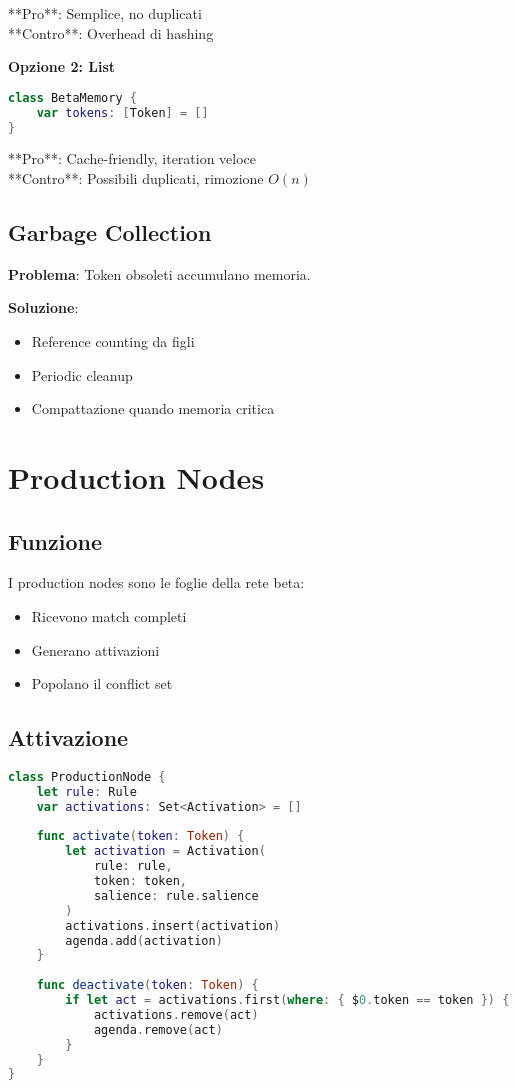 **Pro**: Semplice, no duplicati \\
**Contro**: Overhead di hashing

\textbf{Opzione 2: List}
\begin{lstlisting}[language=Swift]
class BetaMemory {
    var tokens: [Token] = []
}
\end{lstlisting}

**Pro**: Cache-friendly, iteration veloce \\
**Contro**: Possibili duplicati, rimozione $O(n)$

\subsection{Garbage Collection}

\textbf{Problema}: Token obsoleti accumulano memoria.

\textbf{Soluzione}:
\begin{itemize}
\item Reference counting da figli
\item Periodic cleanup
\item Compattazione quando memoria critica
\end{itemize}

\section{Production Nodes}

\subsection{Funzione}

I production nodes sono le foglie della rete beta:
\begin{itemize}
\item Ricevono match completi
\item Generano attivazioni
\item Popolano il conflict set
\end{itemize}

\subsection{Attivazione}

\begin{lstlisting}[language=Swift]
class ProductionNode {
    let rule: Rule
    var activations: Set<Activation> = []
    
    func activate(token: Token) {
        let activation = Activation(
            rule: rule, 
            token: token,
            salience: rule.salience
        )
        activations.insert(activation)
        agenda.add(activation)
    }
    
    func deactivate(token: Token) {
        if let act = activations.first(where: { $0.token == token }) {
            activations.remove(act)
            agenda.remove(act)
        }
    }
}
\end{lstlisting}

